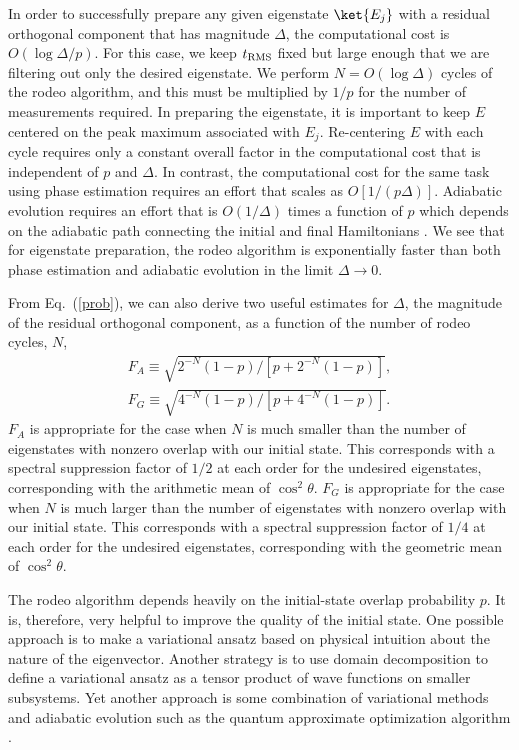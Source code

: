 In order to successfully prepare any given eigenstate $\ket{E_j}$ with a residual orthogonal component that has magnitude $\Delta$, the computational cost is $O(\log \Delta /p)$.  For this case, we keep $t_{\rm RMS}$ fixed but large enough that we are filtering out only the desired eigenstate.  We perform $N = O(\log \Delta)$ cycles of the rodeo algorithm, and this must be multiplied by $1/p$ for the number of measurements required.  In preparing the eigenstate, it is important to keep $E$ centered on the peak maximum associated with $E_j$.  Re-centering $E$ with each cycle requires only a constant overall factor in the computational cost that is independent of $p$ and $\Delta$.  In contrast, the computational cost for the same task using phase estimation requires an effort that scales as $O[1/(p \Delta)]$.  Adiabatic evolution requires an effort that is $O(1/\Delta)$ times a function of $p$ which depends on the adiabatic path connecting the initial and final Hamiltonians \cite{Wiebe:2011a}.  We see that for eigenstate preparation, the rodeo algorithm is exponentially faster than both phase estimation and adiabatic evolution in the limit $\Delta \rightarrow 0$.

 From Eq.~(\ref{prob}), we can also derive two useful estimates for $\Delta$, the magnitude of the residual orthogonal component, as a function of the number of rodeo cycles, $N$,
 \begin{align}
    F_A \equiv \sqrt{2^{-N}(1-p)/[p+2^{-N}(1-p)]},\nonumber \\
     F_G \equiv \sqrt{4^{-N}(1-p)/[p+4^{-N}(1-p)]}. \label{estimates}
 \end{align}
$F_A$ is appropriate for the case when $N$ is much smaller than the number of eigenstates with nonzero overlap with our initial state.  This corresponds with a spectral suppression factor of $1/2$ at each order for the undesired eigenstates, corresponding with the arithmetic mean of $\cos^2 \theta$.  $F_G$ is appropriate for the case when $N$ is much larger than the number of eigenstates with nonzero overlap with our initial state.  This corresponds with a spectral suppression factor of $1/4$ at each order for the undesired eigenstates, corresponding with the geometric mean of $\cos^2 \theta$.  

The rodeo algorithm depends heavily on the initial-state overlap probability $p$.  It is, therefore, very helpful to improve the quality of the initial state.  One possible approach is to make a variational ansatz based on physical intuition about the nature of the eigenvector.  Another strategy is to use domain decomposition to define a variational ansatz as a tensor product of wave functions on smaller subsystems.  Yet another approach is some combination of variational methods and adiabatic evolution such as the quantum approximate optimization algorithm \cite{Farhi:2014}.

